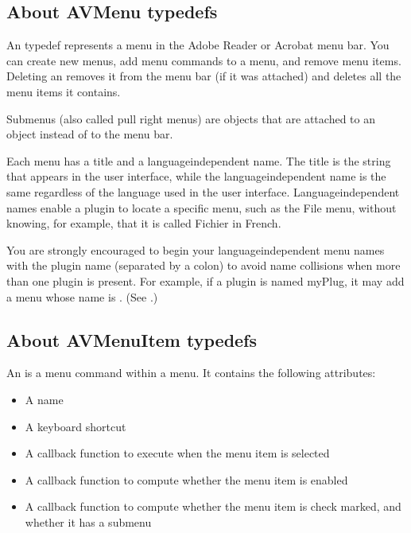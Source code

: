 \documentclass[letterpaper,12pt,english,openany,oneside]{sphinxmanual}
\begin{document}
\subsection{About AVMenu typedefs}
\label{\detokenize{Plugins_Menu:about-avmenu-typedefs}}
An  typedef represents a menu in the Adobe Reader or Acrobat menu bar. You can create new menus, add menu commands to a menu, and remove menu items. Deleting an  removes it from the menu bar (if it was attached) and deletes all the menu items it contains.

Submenus (also called pull right menus) are  objects that are attached to an  object instead of to the menu bar.

Each menu has a title and a language\sphinxhyphen{}independent name. The title is the string that appears in the user interface, while the language\sphinxhyphen{}independent name is the same regardless of the language used in the user interface. Language\sphinxhyphen{}independent names enable a plugin to locate a specific menu, such as the File menu, without knowing, for example, that it is called Fichier in French.

You are strongly encouraged to begin your language\sphinxhyphen{}independent menu names with the plugin name (separated by a colon) to avoid name collisions when more than one plugin is present. For example, if a plugin is named myPlug, it may add a menu whose name is . (See .)


\subsection{About AVMenuItem typedefs}
\label{\detokenize{Plugins_Menu:about-avmenuitem-typedefs}}
An  is a menu command within a menu. It contains the following attributes:
\begin{itemize}
\item {} 
A name

\item {} 
A keyboard shortcut

\item {} 
A callback function to execute when the menu item is selected

\item {} 
A callback function to compute whether the menu item is enabled

\item {} 
A callback function to compute whether the menu item is check marked, and whether it has a submenu

\end{itemize}
\end{document}
